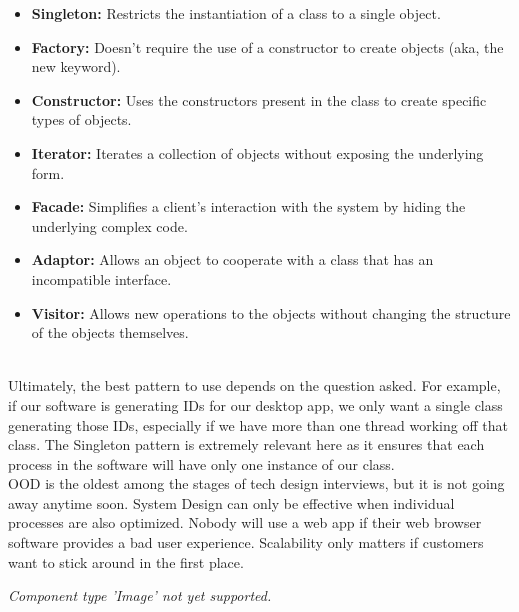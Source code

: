 \begin{itemize}
\item
\protect{}\label{zcmxh80sLxKulggVjd0XO}
\textbf{Singleton:} Restricts the instantiation of a class to a single object.
\item
\protect{}\label{p2n8gQPtdqmkfpIHDdA2O}
\textbf{Factory:} Doesn't require the use of a constructor to create objects (aka, the new keyword).
\item
\protect{}\label{bvVUM8w_lKhxTBLfvElnq}
\textbf{Constructor:} Uses the constructors present in the class to create specific types of objects.
\item
\protect{}\label{p0kB0rk6SJI6ap63SO3-K}
\textbf{Iterator:} Iterates a collection of objects without exposing the underlying form.
\item
\protect{}\label{IhZmC27hetvUgip8UFJJR}
\textbf{Facade:} Simplifies a client's interaction with the system by hiding the underlying complex code.
\item
\protect{}\label{pma8Lr8TvqJtQP85-lDce}
\textbf{Adaptor:} Allows an object to cooperate with a class that has an incompatible interface.
\item
\protect{}\label{WsL1ARVO8R7foxHhr5rwJ}
\textbf{Visitor:} Allows new operations to the objects without changing the structure of the objects themselves.
\end{itemize}
\\
Ultimately, the best pattern to use depends on the question asked. For example, if our software is generating IDs for our desktop app, we only want a single class generating those IDs, especially if we have more than one thread working off that class. The Singleton pattern is extremely relevant here as it ensures that each process in the software will have only one instance of our class.
\\
OOD is the oldest among the stages of tech design interviews, but it is not going away anytime soon. System Design can only be effective when individual processes are also optimized. Nobody will use a web app if their web browser software provides a bad user experience. Scalability only matters if customers want to stick around in the first place.

\textit{Component type 'Image' not yet supported.}

